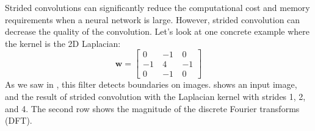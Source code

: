 Strided convolutions can significantly reduce the computational cost and memory requirements when a neural network is large. However, strided convolution can decrease the quality of the convolution. Let's look at one concrete example where the kernel is the 2D Laplacian:
\begin{equation}
\mathbf{w} = 
\begin{bmatrix}
  0 ~& -1 ~& 0 \\
  -1 ~& 4 ~& -1\\
  0~& -1 ~& 0
\end{bmatrix}
\end{equation}
As we saw in \chap{\ref{chapter:image_derivatives}}, this filter detects boundaries on images. \Fig{\ref{fig:convolutional_neural_nets:strided_conv_results}} shows an input image, and the result of strided convolution with the Laplacian kernel with strides 1, 2, and 4. The second row shows the magnitude of the discrete Fourier transforms (DFT).


